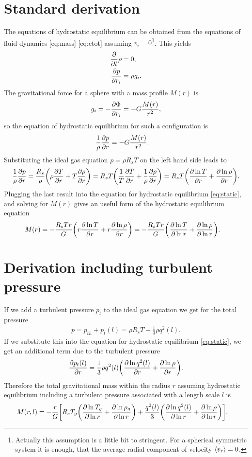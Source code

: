 \section{Standard derivation}
The equations of hydrostatic equilibrium can be obtained from the equations of
fluid dynamics \eqref{eq:mass}-\eqref{eq:etot} assuming $v_i =
0$\footnote{Actually this assumption is a little bit to stringent. For a
spherical symmetric system it is enough, that the average radial component of
velocity $\fil{v_r}=0$.}. This yields
\begin{align}
\pd{t}\rho &= 0,\\
\ppd{r_i}{p} &= \rho g_i. 
\end{align}
The gravitational force for a sphere with a mass profile $M(r)$ is 
\begin{align}
g_i=-\ppd{r_i}{\Phi} = -G \frac{M(r)}{r^2}, 
\end{align}
so the equation of hydrostatic equilibrium for such a configuration is
\begin{align}
\frac{1}{\rho}\ppd{r}{p} &=-G \frac{M(r)}{r^2}.\label{eq:static}
\end{align}
Substituting the ideal gas equation $p= \rho R_s T$ on the left hand side leads
to
\begin{align}
\frac{1}{\rho}\ppd{r}{p} = 
\frac{R_s}{\rho}\lra{\rho\ppd{r}{T}+T\ppd{r}{\rho}}=
R_s T \lra{\frac{1}{T}\ppd{r}{T}+\frac{1}{\rho}\ppd{r}{\rho}}=
R_s T \lra{\ppd{r}{\ln T}+\ppd{r}{\ln \rho}}.
\end{align}
Plugging the last result into the equation for hydrostatic equilibrium
\eqref{eq:static}, and solving for $M(r)$ gives an useful form of the
hydrostatic equilibrium equation
\begin{align}
M(r) &= - \frac{R_s T r}{G} \lra{r \ppd{r}{\ln T}+r \ppd{r}{\ln \rho}}
= - \frac{R_s T r}{G} \lra{\ppd{\ln r}{\ln T}+\ppd{\ln r}{\ln \rho}}.
\end{align}
\section{Derivation including turbulent pressure}
If we add a turbulent pressure $p_t$ to the ideal gas equation we get for the
total pressure
\begin{align}
p =p_{th}+p_t(l)=\rho R_s T+\frac{1}{3}\rho q^2(l).
\end{align}
If we substitute this into the equation for hydrostatic equilibrium
\eqref{eq:static}, we get an additional term due to the turbulent pressure
\begin{align}
\ppd{r}{p_t(l)} = \frac{1}{3}\rho q^2(l) 
\lra{\ppd{r}{\ln q^2(l)}+\ppd{r}{\ln \rho}}.
\end{align}
Therefore the total gravitational mass within the radius
$r$ assuming hydrostatic equilibrium including a turbulent pressure associated
with a length scale $l$ is
\begin{align}
M(r,l) &= - \frac{r}{G} 
\lrb{R_s T_g \lra{\ppd{\ln r}{\ln T_g}+\ppd{\ln r}{\ln \rho_g}}
+\frac{q^2(l)}{3}\lra{\ppd{\ln r}{\ln q^2(l)}+\ppd{\ln r}{\ln \rho}}}.
\end{align}

